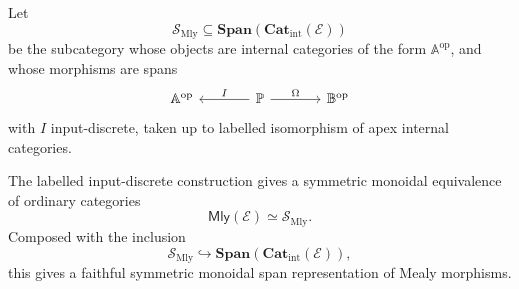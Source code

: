 \begin{definition}
\label{def:span-subcategory-mealy}
Let
\[
\mathcal S_{\mathrm{Mly}}
\subseteq
\mathbf{Span}(\mathbf{Cat}_{\mathrm{int}}(\mathcal E))
\]
be the subcategory whose objects are internal categories of the form
\(\mathbb A^{\mathrm{op}}\), and whose morphisms are spans
\[
\begin{tikzcd}[column sep=large]
\mathbb A^{\mathrm{op}}
&
\mathbb P
  \arrow[l, "I"']
  \arrow[r, "\Omega"]
&
\mathbb B^{\mathrm{op}}
\end{tikzcd}
\]
with \(I\) input-discrete, taken up to labelled isomorphism of apex internal
categories.
\end{definition}

\begin{theorem}
\label{thm:mealy-as-input-discrete-spans}
The labelled input-discrete construction gives a symmetric monoidal
equivalence of ordinary categories
\[
\mathsf{Mly}(\mathcal E)
\simeq
\mathcal S_{\mathrm{Mly}}.
\]
Composed with the inclusion
\[
\mathcal S_{\mathrm{Mly}}
\hookrightarrow
\mathbf{Span}(\mathbf{Cat}_{\mathrm{int}}(\mathcal E)),
\]
this gives a faithful symmetric monoidal span representation of Mealy
morphisms.
\end{theorem}

